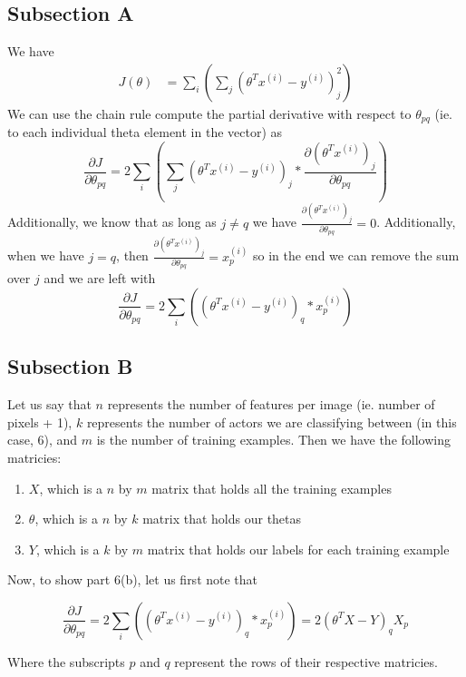 \documentclass[11pt,a4paper]{report}
\begin{document}
\subsection*{Subsection A}
We have 
\begin{align}
J(\theta)&=\sum_i(\sum_j(\theta^T x^{(i)} - y^{(i)})^2_j)
\end{align}
We can use the chain rule compute the partial derivative with respect to $\theta_{pq}$ (ie. to each individual theta element in the vector) as
\begin{equation}
\frac{\partial J}{\partial \theta_{pq}} = 2 \sum_i(\sum_j(\theta^T x^{(i)} - y^{(i)})_j*\frac{\partial (\theta^T x^{(i)})_j}{\partial \theta_{pq}})
\end{equation} 
Additionally, we know that as long as $j\neq q$ we have $\frac{\partial (\theta^T x^{(i)})_j}{\partial \theta_{pq}} = 0$. Additionally, when we have $j=q$, then $\frac{\partial (\theta^T x^{(i)})_j}{\partial \theta_{pq}} = x^{(i)}_p$ so in the end we can remove the sum over $j$ and we are left with 
\begin{equation}
\frac{\partial J}{\partial \theta_{pq}} = 2 \sum_i((\theta^T x^{(i)} - y^{(i)})_q*x^{(i)}_p)
\end{equation}

\subsection*{Subsection B}
Let us say that $n$ represents the number of features per image (ie. number of pixels + 1), $k$ represents the number of actors we are classifying between (in this case, 6), and $m$ is the number of training examples. Then we have the following matricies:
\begin{enumerate}
\item $X$, which is a $n$ by $m$ matrix that holds all the training examples
\item $\theta$, which is a $n$ by $k$ matrix that holds our thetas
\item $Y$, which is a $k$ by $m$ matrix that holds our labels for each training example
\end{enumerate}
Now, to show part 6(b), let us first note that 

\begin{equation}
\frac{\partial J}{\partial \theta_{pq}} = 2 \sum_i((\theta^T x^{(i)} - y^{(i)})_q*x^{(i)}_p) = 2(\theta^TX-Y)_qX_p
\end{equation}

Where the subscripts $p$ and $q$ represent the rows of their respective matricies. \\
\end{document}
